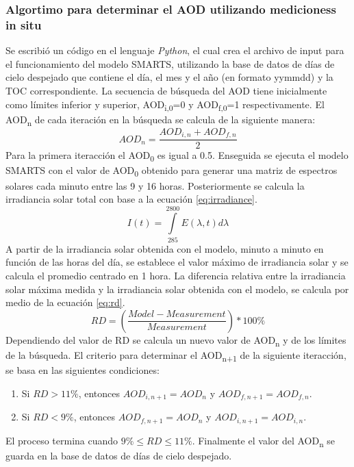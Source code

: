 \subsubsection{Algortimo para determinar el AOD utilizando medicioness in situ}
Se escribió un código en el lenguaje \textit{Python}, el cual crea el archivo de input para el funcionamiento del modelo SMARTS, utilizando la base de datos de días de cielo despejado que contiene el día, el mes y el año (en formato yymmdd) y la TOC correspondiente. La secuencia de búsqueda del AOD tiene inicialmente como límites inferior y superior, AOD\textsubscript{i,0}=0 y AOD\textsubscript{f,0}=1 respectivamente. El AOD\textsubscript{n} de cada iteración en la búsqueda se calcula de la siguiente manera:
\begin{equation*}
    AOD_{n}=\frac{AOD_{i,n}+AOD_{f,n}}{2}
\end{equation*}
Para la primera iteracción el AOD\textsubscript{0} es igual a 0.5. Enseguida se ejecuta el modelo SMARTS con el valor de AOD\textsubscript{0} obtenido para generar una matriz de espectros solares cada minuto entre las 9 y 16 horas. Posteriormente se calcula la irradiancia solar total con base a la ecuación \ref{eq:irradiance}.
\begin{equation}
    I(t) = \int\limits_{285}^{2800} E(\lambda,t) d\lambda
    \label{eq:irradiance}
\end{equation}
A partir de la irradiancia solar obtenida con el modelo, minuto a minuto en función de las horas del día, se establece el valor máximo de irradiancia solar y se calcula el promedio centrado en 1 hora. La diferencia relativa entre la irradiancia solar máxima medida y la irradiancia solar obtenida con el modelo, se calcula por medio de la ecuación \ref{eq:rd}.
\begin{equation}
    RD = \left(\frac{Model-Measurement}{Measurement}\right)*100\%
    \label{eq:rd}
\end{equation}
Dependiendo del valor de RD se calcula un nuevo valor de AOD\textsubscript{n} y de los límites de la búsqueda. El criterio para determinar el AOD\textsubscript{n+1} de la siguiente iteracción, se basa en las siguientes condiciones:
\begin{enumerate}
    \item Si $RD>11\%$, entonces $AOD_{i,n+1}=AOD_{n}$ y $AOD_{f,n+1}=AOD_{f,n}$.
    \item Si $RD<9\%$, entonces $AOD_{f,n+1}=AOD_{n}$ y $AOD_{i,n+1}=AOD_{i,n}$.
\end{enumerate}
El proceso termina cuando $9\%  \leq RD \leq 11\%$. Finalmente el valor del AOD\textsubscript{n} se guarda en la base de datos de días de cielo despejado.